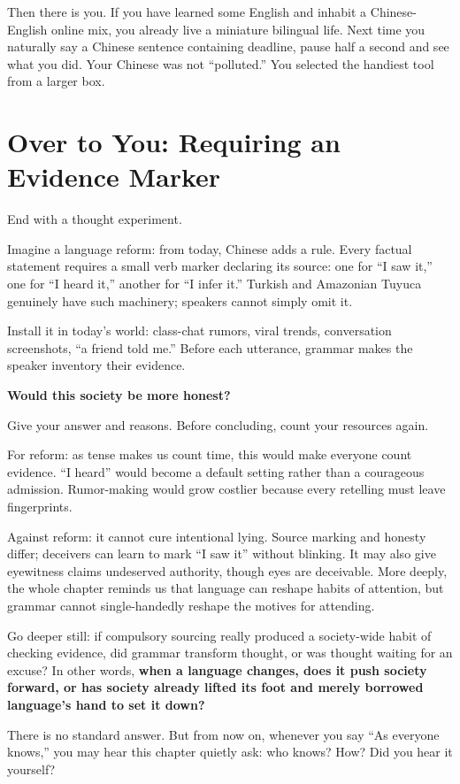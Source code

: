 Then there is you. If you have learned some English and inhabit a Chinese-English online mix, you already live a miniature bilingual life. Next time you naturally say a Chinese sentence containing deadline, pause half a second and see what you did. Your Chinese was not ``polluted.'' You selected the handiest tool from a larger box.

\section{Over to You: Requiring an Evidence Marker}
End with a thought experiment.

Imagine a language reform: from today, Chinese adds a rule. Every factual statement requires a small verb marker declaring its source: one for ``I saw it,'' one for ``I heard it,'' another for ``I infer it.'' Turkish and Amazonian Tuyuca genuinely have such machinery; speakers cannot simply omit it.

Install it in today's world: class-chat rumors, viral trends, conversation screenshots, ``a friend told me.'' Before each utterance, grammar makes the speaker inventory their evidence.

\textbf{Would this society be more honest?}

Give your answer and reasons. Before concluding, count your resources again.

For reform: as tense makes us count time, this would make everyone count evidence. ``I heard'' would become a default setting rather than a courageous admission. Rumor-making would grow costlier because every retelling must leave fingerprints.

Against reform: it cannot cure intentional lying. Source marking and honesty differ; deceivers can learn to mark ``I saw it'' without blinking. It may also give eyewitness claims undeserved authority, though eyes are deceivable. More deeply, the whole chapter reminds us that language can reshape habits of attention, but grammar cannot single-handedly reshape the motives for attending.

Go deeper still: if compulsory sourcing really produced a society-wide habit of checking evidence, did grammar transform thought, or was thought waiting for an excuse? In other words, \textbf{when a language changes, does it push society forward, or has society already lifted its foot and merely borrowed language's hand to set it down?}

There is no standard answer. But from now on, whenever you say ``As everyone knows,'' you may hear this chapter quietly ask: who knows? How? Did you hear it yourself?
